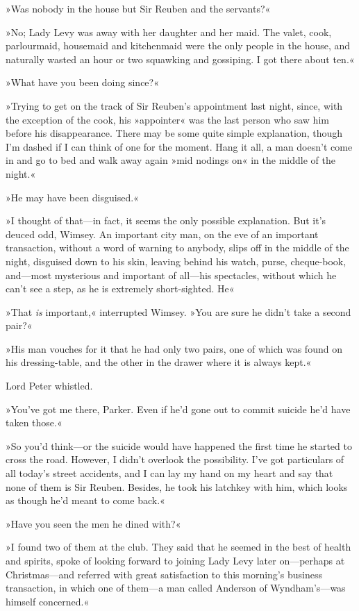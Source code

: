 »Was nobody in the house but Sir Reuben and the servants?«

»No; Lady Levy was away with her daughter and her maid. The valet, cook, parlourmaid, housemaid and kitchenmaid were the only people in the house, and naturally wasted an hour or two squawking and gossiping. I got there about ten.«

»What have you been doing since?«

»Trying to get on the track of Sir Reuben's appointment last night, since, with the exception of the cook, his »appointer« was the last person who saw him before his disappearance. There may be some quite simple explanation, though I'm dashed if I can think of one for the moment. Hang it all, a man doesn't come in and go to bed and walk away again »mid nodings on« in the middle of the night.«

»He may have been disguised.«

»I thought of that—in fact, it seems the only possible explanation. But it's deuced odd, Wimsey. An important city man, on the eve of an important transaction, without a word of warning to anybody, slips off in the middle of the night, disguised down to his skin, leaving behind his watch, purse, cheque-book, and—most mysterious and important of all—his spectacles, without which he can't see a step, as he is extremely short-sighted. He\longdash«

»That \textit{is} important,« interrupted Wimsey. »You are sure he didn't take a second pair?«

»His man vouches for it that he had only two pairs, one of which was found on his dressing-table, and the other in the drawer where it is always kept.«

Lord Peter whistled.

»You've got me there, Parker. Even if he'd gone out to commit suicide he'd have taken those.«

»So you'd think—or the suicide would have happened the first time he started to cross the road. However, I didn't overlook the possibility. I've got particulars of all today's street accidents, and I can lay my hand on my heart and say that none of them is Sir Reuben. Besides, he took his latchkey with him, which looks as though he'd meant to come back.«

»Have you seen the men he dined with?«

»I found two of them at the club. They said that he seemed in the best of health and spirits, spoke of looking forward to joining Lady Levy later on—perhaps at Christmas—and referred with great satisfaction to this morning's business transaction, in which one of them—a man called Anderson of Wyndham's—was himself concerned.«

